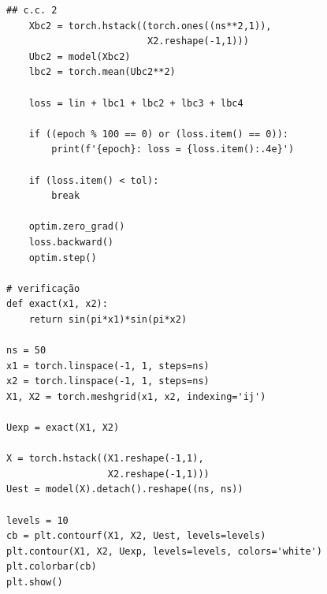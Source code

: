 \begin{lstlisting}[caption=py\_pinn\_poisson]
    ## c.c. 2
    Xbc2 = torch.hstack((torch.ones((ns**2,1)),
                         X2.reshape(-1,1)))
    Ubc2 = model(Xbc2)
    lbc2 = torch.mean(Ubc2**2)

    loss = lin + lbc1 + lbc2 + lbc3 + lbc4

    if ((epoch % 100 == 0) or (loss.item() == 0)):
        print(f'{epoch}: loss = {loss.item():.4e}')

    if (loss.item() < tol):
        break

    optim.zero_grad()
    loss.backward()
    optim.step()

# verificação
def exact(x1, x2):
    return sin(pi*x1)*sin(pi*x2)

ns = 50
x1 = torch.linspace(-1, 1, steps=ns)
x2 = torch.linspace(-1, 1, steps=ns)
X1, X2 = torch.meshgrid(x1, x2, indexing='ij')

Uexp = exact(X1, X2)

X = torch.hstack((X1.reshape(-1,1),
                  X2.reshape(-1,1)))
Uest = model(X).detach().reshape((ns, ns))

levels = 10
cb = plt.contourf(X1, X2, Uest, levels=levels)
plt.contour(X1, X2, Uexp, levels=levels, colors='white')
plt.colorbar(cb)
plt.show()
\end{lstlisting}



